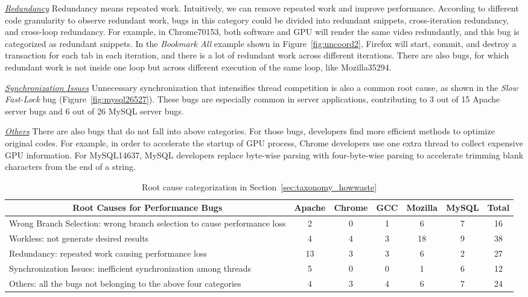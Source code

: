\underline{\it Redundancy} 
Redundancy means repeated work. 
Intuitively, we can remove repeated work and improve performance. 
According to different code granularity to observe redundant work, 
bugs in this category could be divided into redundant snippets, 
cross-iteration redundancy, and cross-loop redundancy.  
For example, in Chrome70153, 
both software and GPU will render the same video redundantly, 
and this bug is categorized as redundant snippets. 
In the {\it Bookmark All} example shown in Figure~\ref{fig:uncoord2}, 
Firefox will start, commit, and destroy a transaction for each tab in each iteration, 
and there is a lot of redundant work across different iterations. 
There are also bugs, for which redundant work is not inside one loop
but across different execution of the same loop, like Mozilla35294. 


\underline{\it Synchronization Issues}
Unnecessary synchronization that intensifies thread competition 
is also a common root cause, as shown in the {\it Slow Fast-Lock} bug (Figure~\ref{fig:mysql26527}). 
These bugs are especially common in server applications, contributing to 3 out of 15 Apache server bugs and 6 out of 26 MySQL server bugs.


\underline{\it Others}
There are also bugs that do not fall into above categories. 
For those bugs, developers find more efficient methods to optimize original codes. 
For example, in order to accelerate the startup of GPU process, Chrome developers use one extra thread to collect expensive GPU information. 
For MySQL14637, MySQL developers replace byte-wise parsing with four-byte-wise parsing to accelerate trimming blank characters from the end of a string. 

\begin{table*}[tb!]
\begin{adjustwidth}{-.5in}{-.5in}
\scriptsize
\centering
{

\begin{tabular}{lcccccc}
\toprule
\multicolumn{1}{c}{\bf Root Causes for Performance Bugs} &Apache&Chrome&GCC&Mozilla&MySQL&Total\\
\midrule
\multicolumn{1}{l}{Wrong Branch Selection: wrong branch selection to cause performance loss}
&2&0&1&6&7&16\\
\midrule
\multicolumn{1}{l}{Workless: not generate desired results}
&4&4&3&18&9&38\\
\midrule
\multicolumn{1}{l}{Redundancy: repeated work causing performance loss}
&13&3&3&6&2&27\\
\midrule
\multicolumn{1}{l}{Synchronization Issues: inefficient synchronization among threads}
&5&0&0&1&6&12\\
\midrule
\multicolumn{1}{l}{Others: all the bugs not belonging to the above four categories}
&4&3&4&6&7&24\\
\bottomrule

\end{tabular}
}
\end{adjustwidth}
\caption{Root cause categorization in Section~\ref{sec:taxonomy_howwaste}}
\label{tab:root_cause}
\end{table*}








